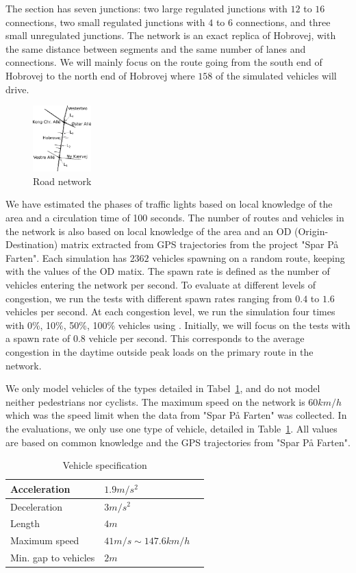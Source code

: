 The section has seven junctions: two large regulated junctions with $12$ to $16$ connections, two small regulated junctions with $4$ to $6$ connections, and three small unregulated junctions.
The network is an exact replica of Hobrovej, with the same distance between segments and the same number of lanes and connections.
We will mainly focus on the route going from the south end of Hobrovej to the north end of Hobrovej where $158$ of the simulated vehicles will drive.
\begin{figure}[htb]
\centering
\includegraphics[width=0.2\textwidth]{../images/HobrovejNy.png}
\caption{Road network}
\label{fig:Introduction:hobro}
\end{figure}

We have estimated the phases of traffic lights based on local knowledge of the area and a circulation time of 100 seconds.
The number of routes and vehicles in the network is also based on local knowledge of the area and an OD (Origin-Destination) matrix extracted from GPS trajectories from the project "Spar På Farten"\cite{SparPaFarten}.
Each simulation has $2362$ vehicles spawning on a random route, keeping with the values of the OD matix.
The spawn rate is defined as the number of vehicles entering the network per second.
To evaluate \tech at different levels of congestion, we run the tests with different spawn rates ranging from $0.4$ to $1.6$ vehicles per second.
At each congestion level, we run the simulation four times with 0\%, 10\%, 50\%, 100\% vehicles using \tech.
Initially, we will focus on the tests with a spawn rate of $0.8$ vehicle per second. %
This corresponds to the average congestion in the daytime outside peak loads on the primary route in the network.

We only model vehicles of the types detailed in Tabel~\ref{table.vehicleTypes}, and do not model neither pedestrians nor cyclists.
The maximum speed on the network is $60km/h$ which was the speed limit when the data from "Spar På Farten" was collected.
In the evaluations, we only use one type of vehicle, detailed in Table~\ref{table.vehicleTypes}. 
All values are based on common knowledge and the GPS trajectories from "Spar På Farten".

\begin{table}
\centering
\begin{tabular}{|l|l|l|}\hline
Acceleration			& $1.9 m/s^2$	\\\hline
Deceleration			& $3 m/s^2$ 	\\\hline
Length					& $4 m$ 		\\\hline
Maximum speed			& $41 m/s \sim 147.6 km/h$ \\\hline
Min. gap to vehicles	& $2 m$ 		\\\hline
\end{tabular}
\caption{Vehicle specification}\label{table.vehicleTypes}
\end{table}


